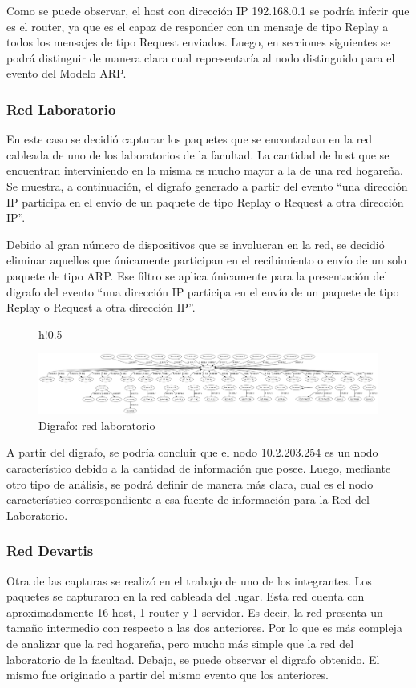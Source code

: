 Como se puede observar, el host con dirección IP 192.168.0.1 se podría inferir que es el router, ya que es el capaz de responder con un mensaje de tipo Replay a todos los mensajes de tipo Request enviados. Luego, en secciones siguientes se podrá distinguir de manera clara cual representaría al nodo distinguido para el evento del Modelo ARP. 

\subsubsection{Red Laboratorio}
En este caso se decidió capturar los paquetes que se encontraban en la red cableada de uno de los laboratorios de la facultad. La cantidad de host que se encuentran interviniendo en la misma es mucho mayor a la de una red hogareña. Se muestra, a continuación, el digrafo generado a partir del evento ``una dirección IP participa en el envío de un paquete de tipo Replay o Request a otra dirección IP''. 

Debido al gran número de dispositivos que se involucran en la red, se decidió eliminar aquellos que únicamente participan en el recibimiento o envío de un solo paquete de tipo ARP. Ese filtro se aplica únicamente para la presentación del digrafo del evento ``una dirección IP participa en el envío de un paquete de tipo Replay o Request a otra dirección IP''.

\begin{figure}{h!}{0.5\textwidth}
  \begin{center}
    \includegraphics[angle=90, scale=0.3]{./graficos/grafos-arp/grafo_labo5.png}
  \end{center}
  \caption{Digrafo: red laboratorio}
\end{figure}

A partir del digrafo, se podría concluir que el nodo 10.2.203.254 es un nodo característico debido a la cantidad de información que posee. Luego, mediante otro tipo de análisis, se podrá definir de manera más clara, cual es el nodo característico correspondiente a esa fuente de información para la Red del Laboratorio. 


\subsubsection{Red Devartis}
Otra de las capturas se realizó en el trabajo de uno de los integrantes. Los paquetes se capturaron en la red cableada del lugar. Esta red cuenta con aproximadamente 16 host, 1 router y 1 servidor. Es decir, la red presenta un tamaño intermedio con respecto a las dos anteriores. Por lo que es más compleja de analizar que la red hogareña, pero mucho más simple que la red del laboratorio de la facultad. 
Debajo, se puede observar el digrafo obtenido. El mismo fue originado a partir del mismo evento que los anteriores. 

